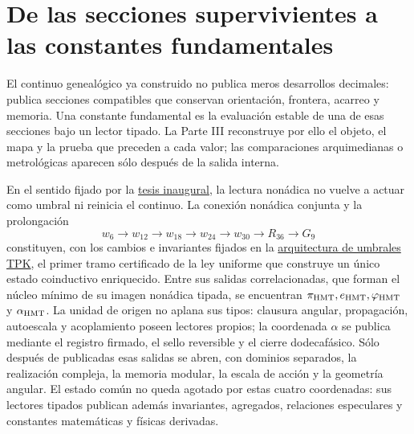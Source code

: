 \section*{De las secciones supervivientes a las constantes fundamentales}

El continuo genealógico ya construido no publica meros desarrollos decimales: publica secciones compatibles que conservan orientación, frontera, acarreo y memoria. Una constante fundamental es la evaluación estable de una de esas secciones bajo un lector tipado. La Parte III reconstruye por ello el objeto, el mapa y la prueba que preceden a cada valor; las comparaciones arquimedianas o metrológicas aparecen sólo después de la salida interna.

En el sentido fijado por la
\hyperref[sec:tesis-inaugural-helicoidal-hmt-md]{tesis inaugural}, la lectura
nonádica no vuelve a actuar como umbral ni reinicia el continuo. La conexión nonádica conjunta y la prolongación
\[
w_6\longrightarrow w_{12}\longrightarrow w_{18}\longrightarrow w_{24}\longrightarrow w_{30}\longrightarrow R_{36}\longrightarrow G_9
\]
constituyen, con los cambios e invariantes fijados en la
\hyperref[sec:umbrales-prolongacion-tpk-inaugural]{arquitectura de umbrales
TPK}, el primer tramo certificado de la ley uniforme que construye un único
estado coinductivo enriquecido. Entre sus salidas correlacionadas, que forman
el núcleo mínimo de su imagen nonádica tipada, se encuentran
\(\pi_{\rm HMT},e_{\rm HMT},\varphi_{\rm HMT}\) y \(\alpha_{\rm HMT}\). La unidad de origen no aplana sus tipos: clausura angular, propagación, autoescala y acoplamiento poseen lectores propios; la coordenada \(\alpha\) se publica mediante el registro firmado, el sello reversible y el cierre dodecafásico. Sólo después de publicadas esas salidas se abren, con dominios separados, la realización compleja, la memoria modular, la escala de acción y la geometría angular. El estado común no queda agotado por estas cuatro coordenadas: sus lectores tipados publican además invariantes, agregados, relaciones especulares y constantes matemáticas y físicas derivadas.
